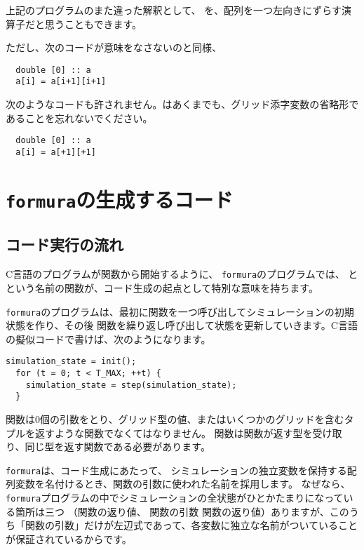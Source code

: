 \documentclass{jsarticle}
\newcommand{\formura}{{\texttt{formura}}}
\begin{document}
上記のプログラムのまた違った解釈として、
\lit{[+1]}を、配列を一つ左向きにずらす演算子だと思うこともできます。

ただし、次のコードが意味をなさないのと同様、

\begin{lstlisting}
  double [0] :: a
  a[i] = a[i+1][i+1]
\end{lstlisting}

次のようなコードも許されません。\lit{[+1]}はあくまでも、グリッド添字変数の省略形であることを忘れないでください。

\begin{lstlisting}
  double [0] :: a
  a[i] = a[+1][+1]
\end{lstlisting}


\newpage

\section{\formura の生成するコード}\label{sec:formura-generated-code}

\subsection{コード実行の流れ}

C言語のプログラムが関数から開始するように、
\formura のプログラムでは、
と
という名前の関数が、コード生成の起点として特別な意味を持ちます。

\formura のプログラムは、最初に関数を一つ呼び出してシミュレーションの初期状態を作り、その後
関数を繰り返し呼び出して状態を更新していきます。C言語の擬似コードで書けば、次のようになります。

\begin{lstlisting}[mathescape]
  simulation_state = init();
  for (t = 0; t < T_MAX; ++t) {
    simulation_state = step(simulation_state);
  }
\end{lstlisting}


関数は0個の引数をとり、グリッド型の値、またはいくつかのグリッドを含むタプルを返すような関数でなくてはなりません。
関数は関数が返す型を受け取り、同じ型を返す関数である必要があります。

\formura は、コード生成にあたって、
シミュレーションの独立変数を保持する配列変数を名付けるとき、関数の引数に使われた名前を採用します。
なぜなら、\formura プログラムの中でシミュレーションの全状態がひとかたまりになっている箇所は三つ
（関数の返り値、
関数の引数
関数の返り値）ありますが、このうち「関数の引数」だけが左辺式であって、各変数に独立な名前がついていることが保証されているからです。
\end{document}
